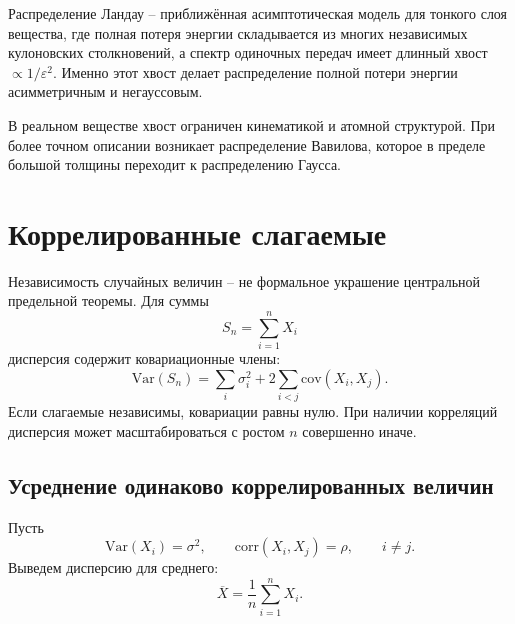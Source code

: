 \documentclass[
  russian,
  12pt,
  a4paper,
  a4paper,
  openany]{scrbook}
\begin{document}
\begin{booknote}

Распределение Ландау -- приближённая асимптотическая модель для тонкого
слоя вещества, где полная потеря энергии складывается из многих
независимых кулоновских столкновений, а спектр одиночных передач имеет
длинный хвост \(\propto1/\varepsilon^2\). Именно этот хвост делает
распределение полной потери энергии асимметричным и негауссовым.

В реальном веществе хвост ограничен кинематикой и атомной структурой.
При более точном описании возникает распределение Вавилова, которое в
пределе большой толщины переходит к распределению Гаусса.

\end{booknote}

\section{Коррелированные
слагаемые}\label{ux43aux43eux440ux440ux435ux43bux438ux440ux43eux432ux430ux43dux43dux44bux435-ux441ux43bux430ux433ux430ux435ux43cux44bux435}

Независимость случайных величин -- не формальное украшение центральной
предельной теоремы. Для суммы \[S_n=\sum_{i=1}^{n}X_i\] дисперсия
содержит ковариационные члены: \[\mathrm{Var}(S_n)
=
\sum_i\sigma_i^2
+2\sum_{i<j}\mathrm{cov}(X_i,X_j).\] Если слагаемые независимы,
ковариации равны нулю. При наличии корреляций дисперсия может
масштабироваться с ростом \(n\) совершенно иначе.

\subsection{Усреднение одинаково коррелированных
величин}\label{ux443ux441ux440ux435ux434ux43dux435ux43dux438ux435-ux43eux434ux438ux43dux430ux43aux43eux432ux43e-ux43aux43eux440ux440ux435ux43bux438ux440ux43eux432ux430ux43dux43dux44bux445-ux432ux435ux43bux438ux447ux438ux43d}

Пусть \[\mathrm{Var}(X_i)=\sigma^2,
\qquad
\mathrm{corr}(X_i,X_j)=\rho,
\qquad i\ne j.\] Выведем дисперсию для среднего:
\[\overline X=\frac1n\sum_{i=1}^{n}X_i.\]
\end{document}
